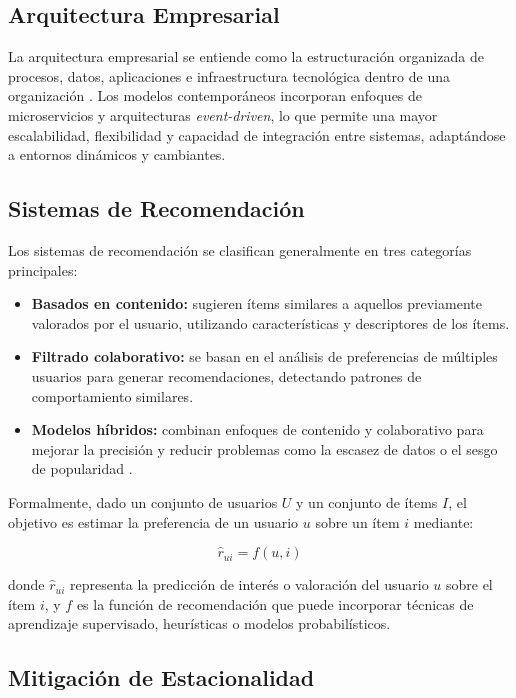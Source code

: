 \documentclass[12pt, letterpaper]{article}
\begin{document}
\subsection{Arquitectura Empresarial}

La arquitectura empresarial se entiende como la estructuración organizada de procesos, datos, aplicaciones e infraestructura tecnológica dentro de una organización \citep{ref12}. Los modelos contemporáneos incorporan enfoques de microservicios y arquitecturas \textit{event-driven}, lo que permite una mayor escalabilidad, flexibilidad y capacidad de integración entre sistemas, adaptándose a entornos dinámicos y cambiantes.

\subsection{Sistemas de Recomendación}

Los sistemas de recomendación se clasifican generalmente en tres categorías principales:

\begin{itemize}
\item \textbf{Basados en contenido:} sugieren ítems similares a aquellos previamente valorados por el usuario, utilizando características y descriptores de los ítems.
\item \textbf{Filtrado colaborativo:} se basan en el análisis de preferencias de múltiples usuarios para generar recomendaciones, detectando patrones de comportamiento similares.
\item \textbf{Modelos híbridos:} combinan enfoques de contenido y colaborativo para mejorar la precisión y reducir problemas como la escasez de datos o el sesgo de popularidad \citep{ref11}.
\end{itemize}

Formalmente, dado un conjunto de usuarios $U$ y un conjunto de ítems $I$, el objetivo es estimar la preferencia de un usuario $u$ sobre un ítem $i$ mediante:

\begin{equation}
\hat{r}_{ui} = f(u, i)
\end{equation}

donde $\hat{r}_{ui}$ representa la predicción de interés o valoración del usuario $u$ sobre el ítem $i$, y $f$ es la función de recomendación que puede incorporar técnicas de aprendizaje supervisado, heurísticas o modelos probabilísticos.

\subsection{Mitigación de Estacionalidad}
\end{document}
